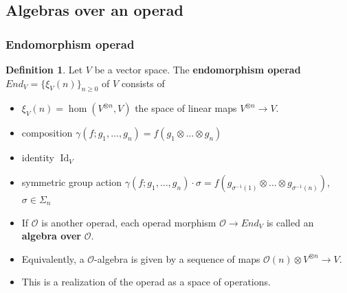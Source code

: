 \documentclass{beamer}
\theoremstyle{definition}
\newtheorem{defi}{Definition}
\begin{document}
\subsection{Algebras over an operad}
\begin{frame}
	\frametitle{Endomorphism operad}
	\begin{defi}
		Let $V$ be a vector space. The \textbf{endomorphism operad} $End_V = \{ \xi_V(n) \}_{n\geq 0}$ of $V$ consists of
		\begin{itemize}
			\item<1-> $\xi_V(n)=\hom(V^{\otimes n},V)
			$ the space of linear maps $V^{\otimes n} \to V$.
			\item<2-> composition $\gamma(f; g_1, \dots, g_n)= f(g_1\otimes\dots\otimes g_n)$
			\item<3-> identity $\operatorname{Id}_V$
			\item<4->  symmetric group action $\gamma (f; g_1, \dots, g_n) \cdot \sigma = f (g_{\sigma^{-1}(1)} \otimes \dots \otimes g_{\sigma^{-1}(n)})$,  $\sigma \in \Sigma_n$
		\end{itemize}
	\end{defi}
\end{frame}
\begin{frame}
\begin{itemize}
\item<1->
If $\mathcal{O}$ is another operad, each operad morphism $\mathcal{O} \to End_V$ is called an \textbf{algebra over} $\mathcal{O}$. 
\item<2->Equivalently, a $\mathcal{O}$-algebra is given by a sequence of maps $\mathcal{O}(n)\otimes V^{\otimes n}\to V$.
\item<3-> This is a realization of the operad as a space of operations.
\end{itemize}
\end{frame}
\end{document}
